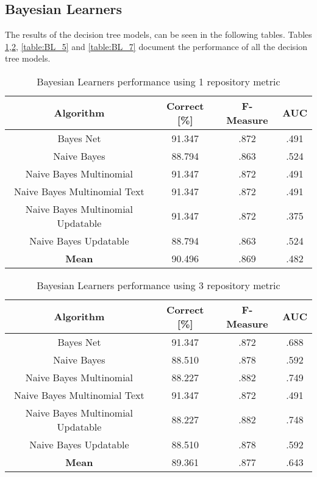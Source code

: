 \subsection{Bayesian Learners}
The results of the decision tree models, can be seen in the following tables. Tables \ref{table:BL_1},\ref{table:BL_3}, \ref{table:BL_5} and \ref{table:BL_7} document the performance of all the decision tree models.
\begin{table}[h!]
\centering
\begin{tabular}{ |c|c|c|c| }
 \hline
 \textbf{Algorithm} & \textbf{Correct [\%]} & \textbf{F-Measure} & \textbf{AUC}  \\
 \hline
 Bayes Net & 91.347 & .872 & .491    \\
 \hline
 Naive Bayes &  88.794 & .863 & .524   \\
 \hline
  Naive Bayes Multinomial & 91.347 & .872 & .491\\
 \hline
  Naive Bayes Multinomial Text & 91.347 & .872 & .491  \\
 \hline
  Naive Bayes Multinomial Updatable & 91.347 & .872 & .375 \\
 \hline
  Naive Bayes Updatable & 88.794 & .863 & .524 \\
 \hline
 \textbf{Mean}  & 90.496 & .869 & .482 \\
 \hline

\end{tabular}
\caption{Bayesian Learners performance using 1 repository metric}
\label{table:BL_1}
\end{table}

\begin{table}[h!]
\centering
\begin{tabular}{ |c|c|c|c| }
 \hline
 \textbf{Algorithm} & \textbf{Correct [\%]} & \textbf{F-Measure} & \textbf{AUC}  \\
 \hline
 Bayes Net & 91.347 & .872 & .688    \\
 \hline
 Naive Bayes &  88.510 & .878 & .592   \\
 \hline
  Naive Bayes Multinomial & 88.227 & .882 & .749\\
 \hline
  Naive Bayes Multinomial Text & 91.347 & .872 & .491  \\
 \hline
  Naive Bayes Multinomial Updatable & 88.227 & .882 & .748 \\
 \hline
  Naive Bayes Updatable & 88.510 & .878 & .592 \\
 \hline
 \textbf{Mean}  & 89.361 & .877 & .643 \\
 \hline
\end{tabular}
\caption{Bayesian Learners performance using 3 repository metric}
\label{table:BL_3}
\end{table}

